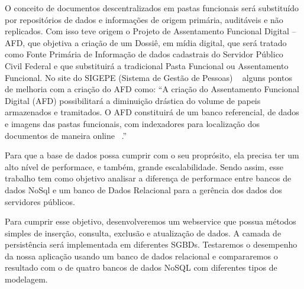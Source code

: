 O conceito de documentos descentralizados em pastas funcionais será substituído por repositórios de dados e informações de origem primária, auditáveis e não replicados. Com isso teve origem o Projeto de Assentamento Funcional Digital – AFD, que objetiva a criação de um Dossiê, em mídia digital, que será tratado como Fonte Primária de Informação de dados cadastrais do Servidor Público Civil Federal e que substituirá a tradicional Pasta Funcional ou Assentamento Funcional. No site do SIGEPE (Sistema de Gestão de Pessoas) ~\cite{siteSIGEPE} alguns pontos de melhoria com a criação do AFD como: “A criação do Assentamento Funcional Digital (AFD) possibilitará a diminuição drástica do volume de papeis armazenados e tramitados. O AFD constituirá de um banco referencial, de dados e imagens das pastas funcionais, com indexadores para localização dos documentos de maneira online ~\cite{apresentAFD}.”

Para que a base de dados possa cumprir com o seu proprósito, ela precisa ter um alto nível de performace, e também, grande escalabilidade. Sendo assim, esse trabalho tem como objetivo analisar a diferença de performace entre bancos de dados NoSql e um banco de Dados Relacional para a gerência dos dados dos servidores públicos.

Para cumprir esse objetivo, desenvolveremos um webservice que possua métodos simples de inserção, consulta, exclusão e atualização de dados. A camada de persistência será implementada em diferentes SGBDs. Testaremos o desempenho da nossa aplicação usando um banco de dados relacional e compararemos o resultado com o de quatro bancos de dados NoSQL com diferentes tipos de modelagem.
